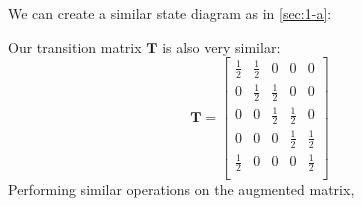\documentclass[]{article}
\begin{document}
We can create a similar state diagram as in \ref{sec:1-a}:
\begin{center}
\end{center}
Our transition matrix \(\mathbf{T}\) is also very similar:
\begin{equation}
	\mathbf{T} = 
	\begin{bmatrix}
	\frac{1}{2} & \frac{1}{2} & 0 & 0 & 0 \\
	0 & \frac{1}{2} & \frac{1}{2} & 0 & 0 \\
	0 & 0 & \frac{1}{2} & \frac{1}{2} & 0 \\
	0 & 0 & 0 & \frac{1}{2} & \frac{1}{2} \\
	\frac{1}{2} & 0 & 0 & 0 & \frac{1}{2} \\
	\end{bmatrix}
\end{equation}
Performing similar operations on the augmented matrix,
\end{document}
